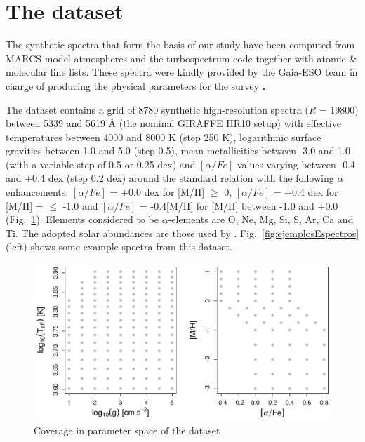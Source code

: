 \documentclass[a4paper,fleqn,usenatbib]{mnras}
\begin{document}
\section{The dataset}
\label{sec:dataset}
The synthetic spectra that form the basis of our study have been
computed from MARCS model atmospheres \citep{gustafsson:08} and the
turbospectrum code \citep{alvarez:98, plez:12} together with atomic \&
molecular line lists. These spectra were kindly provided by the
Gaia-ESO team in charge of producing the physical parameters for the
survey {\bf \citep[see][for further details]{2012A&A...544A.126D}.}

The dataset contains a grid of 8780 synthetic high-resolution spectra 
(\textit{R} = 19800) between 5339 and 5619 {\AA} (the nominal GIRAFFE 
HR10 setup) with effective temperatures between 4000 and 
8000 K (step 250 K), logarithmic surface gravities between 1.0 and 5.0 
(step 0.5), mean metallicities between -3.0 and 1.0 (with a variable step 
of 0.5 or 0.25 dex) and $\left[ \alpha/Fe \right]$ values varying between
-0.4 and +0.4 dex (step 0.2 dex) around the standard relation with the
following $\alpha$ enhancements: $\left[ \alpha/Fe \right]$ = +0.0 dex
for [M/H] $\geqslant$ 0, $\left[ \alpha/Fe \right]$ = +0.4 dex for
[M/H] = $\leqslant$ -1.0 and $\left[ \alpha/Fe \right]$ = -0.4[M/H]
for [M/H] between -1.0 and +0.0 (Fig.~\ref{fig:gridModelos}).
Elements considered to be $\alpha$-elements are O, Ne, Mg, Si, S, Ar,
Ca and Ti. The adopted solar abundances are those used by
\citep{gustafsson:08}. Fig.~\ref{fig:ejemplosEspectros} (left) shows some
example spectra from this dataset.   

\begin{figure}
	\centering\includegraphics[width=\columnwidth]{fig01_grid_modelos.pdf}
	\caption{Coverage in parameter space of the dataset}
	\label{fig:gridModelos}
\end{figure}
\end{document}

